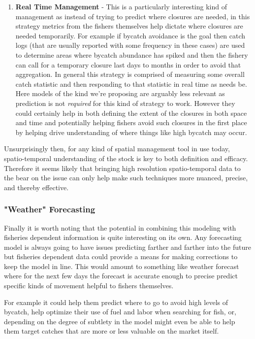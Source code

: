 \documentclass[11pt]{article}
\begin{document}
\begin{enumerate}
\item \textbf{Real Time Management} - This is a particularly interesting kind of management as instead of trying to predict where closures are needed, in this strategy metrics from the fishers themselves help dictate where closures are needed temporarily. For example if bycatch avoidance is the goal then catch logs (that are usually reported with some frequency in these cases) are used to determine areas where bycatch abundance has spiked and then the fishery can call for a temporary closure last days to months in order to avoid that aggregation. In general this strategy is comprised of measuring some overall catch statistic and then responding to that statistic in real time as needs be. Here models of the kind we're proposing are arguably less relevant as prediction is not \textit{required} for this kind of strategy to work. However they could certainly help in both defining the extent of the closures in both space and time and potentially helping fishers avoid such closures in the first place by helping drive understanding of where things like high bycatch may occur. 
\end{enumerate}

Unsurprisingly then, for any kind of spatial management tool in use today, spatio-temporal understanding of the stock is key to both definition and efficacy. Therefore it seems likely that bringing high resolution spatio-temporal data to the bear on the issue can only help make such techniques more nuanced, precise, and thereby effective. 

\subsubsection{"Weather" Forecasting}

Finally it is worth noting that the potential in combining this modeling with fisheries dependent information is quite interesting on its own. Any forecasting model is always going to have issues predicting farther and farther into the future but fisheries dependent data could provide a means for making corrections to keep the model in line. This would amount to something like weather forecast where for the next few days the forecast is accurate enough to precise predict specific kinds of movement helpful to fishers themselves. 

For example it could help them predict where to go to avoid high levels of bycatch, help optimize their use of fuel and labor when searching for fish, or, depending on the degree of subtlety in the model might even be able to help them target catches that are more or less valuable on the market itself. 
\end{document}
